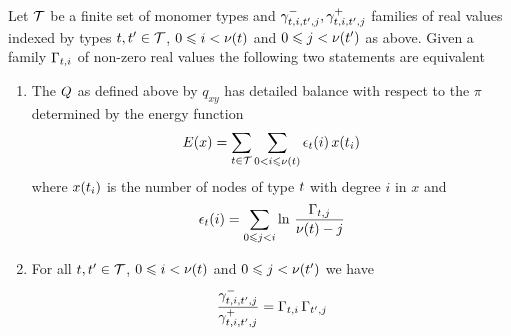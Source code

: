 \begin{proposition}
  \label{prop:cas}
  Let $\mathcal{T}$ be a finite set of monomer types
  and $\gamma^-_{t,i,t',j},\gamma^+_{t,i,t',j}$
  families of real values indexed by types $t,t' \in \mathcal{T}$,
  $0 \leqslant i < \nu(t)$ and
  $0 \leqslant j < \nu(t')$ as above.
  Given a family $\Gamma_{t,i}$ of non-zero real values
  the following two statements are equivalent
  \begin{enumerate}[label={(\roman*)}]
  \item The \qmatrix $Q$ as defined above by $q_{xy}$
    has detailed balance with respect to the \pmf $\pi$
    determined by the energy function
    \[ E(x) = \sum_{t \in \mathcal{T}} \sum_{0 < i \leqslant \nu(t)}
              \epsilon_t(i) \, x(t_i) \]
    where $x(t_i)$ is the number of nodes of type $t$
    with degree $i$ in $x$ and
    \[ \epsilon_t(i) = \sum_{0 \leqslant j < i}
       \ln\, \frac{\Gamma_{t,j}}{\nu(t) - j} \]
  \item For all $t,t' \in \mathcal{T}$,
    $0 \leqslant i < \nu(t)$ and
    $0 \leqslant j < \nu(t')$ we have
    \begin{equation}
      \label{eq:cas-ratio}
      \frac{\gamma^-_{t,i,t',j}}{\gamma^+_{t,i,t',j}} =
      \Gamma_{t,i} \, \Gamma_{t',j}
    \end{equation}
  \end{enumerate}
\end{proposition}
